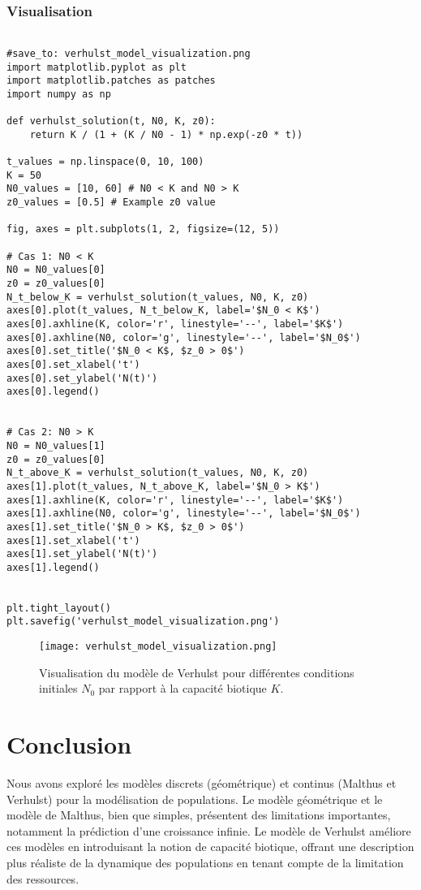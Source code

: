 \documentclass{article}
\begin{document}
\subsubsection{Visualisation}

\begin{verbatim}

#save_to: verhulst_model_visualization.png
import matplotlib.pyplot as plt
import matplotlib.patches as patches
import numpy as np

def verhulst_solution(t, N0, K, z0):
    return K / (1 + (K / N0 - 1) * np.exp(-z0 * t))

t_values = np.linspace(0, 10, 100)
K = 50
N0_values = [10, 60] # N0 < K and N0 > K
z0_values = [0.5] # Example z0 value

fig, axes = plt.subplots(1, 2, figsize=(12, 5))

# Cas 1: N0 < K
N0 = N0_values[0]
z0 = z0_values[0]
N_t_below_K = verhulst_solution(t_values, N0, K, z0)
axes[0].plot(t_values, N_t_below_K, label='$N_0 < K$')
axes[0].axhline(K, color='r', linestyle='--', label='$K$')
axes[0].axhline(N0, color='g', linestyle='--', label='$N_0$')
axes[0].set_title('$N_0 < K$, $z_0 > 0$')
axes[0].set_xlabel('t')
axes[0].set_ylabel('N(t)')
axes[0].legend()


# Cas 2: N0 > K
N0 = N0_values[1]
z0 = z0_values[0]
N_t_above_K = verhulst_solution(t_values, N0, K, z0)
axes[1].plot(t_values, N_t_above_K, label='$N_0 > K$')
axes[1].axhline(K, color='r', linestyle='--', label='$K$')
axes[1].axhline(N0, color='g', linestyle='--', label='$N_0$')
axes[1].set_title('$N_0 > K$, $z_0 > 0$')
axes[1].set_xlabel('t')
axes[1].set_ylabel('N(t)')
axes[1].legend()


plt.tight_layout()
plt.savefig('verhulst_model_visualization.png')
\end{verbatim}

\begin{figure}[h]
    \centering
    \texttt{[image: verhulst\_model\_visualization.png]}
    \caption{Visualisation du modèle de Verhulst pour différentes conditions initiales $N_0$ par rapport à la capacité biotique $K$.}
    \label{fig:verhulst_model_visualization}
\end{figure}


\section{Conclusion}

Nous avons exploré les modèles discrets (géométrique) et continus (Malthus et Verhulst) pour la modélisation de populations. Le modèle géométrique et le modèle de Malthus, bien que simples, présentent des limitations importantes, notamment la prédiction d'une croissance infinie. Le modèle de Verhulst améliore ces modèles en introduisant la notion de capacité biotique, offrant une description plus réaliste de la dynamique des populations en tenant compte de la limitation des ressources.
\end{document}
